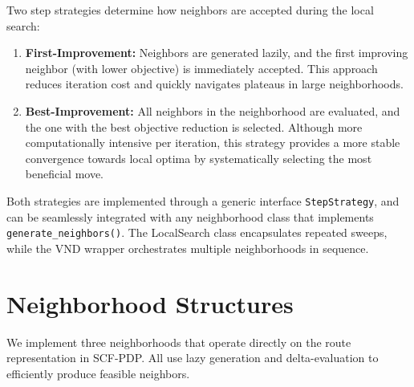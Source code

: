 \documentclass[a4paper]{scrartcl}
\begin{document}
Two step strategies determine how neighbors are accepted during the local search:

\begin{enumerate}
    \item \textbf{First-Improvement:} Neighbors are generated lazily, and the first improving neighbor (with lower objective) is immediately accepted. This approach reduces iteration cost and quickly navigates plateaus in large neighborhoods.
    \item \textbf{Best-Improvement:} All neighbors in the neighborhood are evaluated, and the one with the best objective reduction is selected. Although more computationally intensive per iteration, this strategy provides a more stable convergence towards local optima by systematically selecting the most beneficial move.
\end{enumerate}

Both strategies are implemented through a generic interface \texttt{StepStrategy}, and can be seamlessly integrated with any neighborhood class that implements \texttt{generate\_neighbors()}. The LocalSearch class encapsulates repeated sweeps, while the VND wrapper orchestrates multiple neighborhoods in sequence.

 


\section{Neighborhood Structures}

We implement three neighborhoods that operate directly on the route representation in SCF-PDP. All use lazy generation and delta-evaluation to efficiently produce feasible neighbors.
\end{document}
